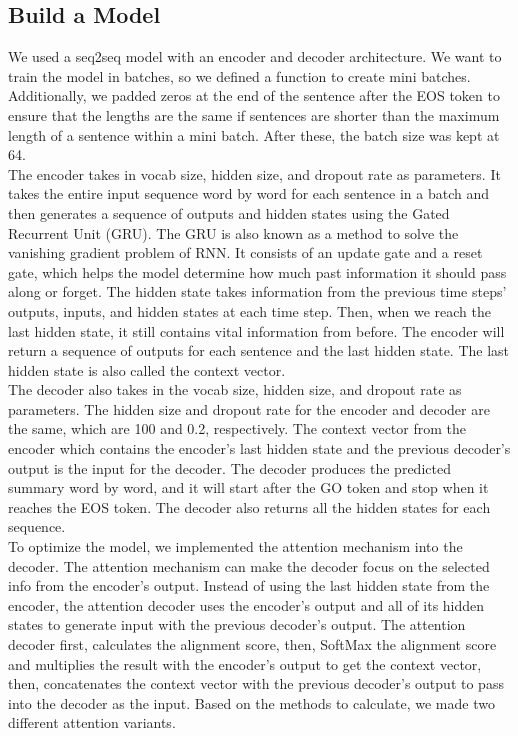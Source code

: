 \documentclass[conference]{IEEEtran}
\begin{document}
\subsection{Build a Model}
\indent We used a seq2seq model with an encoder and decoder architecture. We want to train the model in batches, so we defined a function to create mini batches. Additionally, we padded zeros at the end of the sentence after the EOS token to ensure that the lengths are the same if sentences are shorter than the maximum length of a sentence within a mini batch. After these, the batch size was kept at 64. \\

\indent The encoder takes in vocab size, hidden size, and dropout rate as parameters. It takes the entire input sequence word by word for each sentence in a batch and then generates a sequence of outputs and hidden states using the Gated Recurrent Unit (GRU). The GRU is also known as a method to solve the vanishing gradient problem of RNN. It consists of an update gate and a reset gate, which helps the model determine how much past information it should pass along or forget. The hidden state takes information from the previous time steps’ outputs, inputs, and hidden states at each time step. Then, when we reach the last hidden state, it still contains vital information from before. The encoder will return a sequence of outputs for each sentence and the last hidden state. The last hidden state is also called the context vector. \\
\indent The decoder also takes in the vocab size, hidden size, and dropout rate as parameters. The hidden size and dropout rate for the encoder and decoder are the same, which are 100 and 0.2, respectively. The context vector from the encoder which contains the encoder’s last hidden state and the previous decoder’s output is the input for the decoder. The decoder produces the predicted summary word by word, and it will start after the GO token and stop when it reaches the EOS token. The decoder also returns all the hidden states for each sequence. \\
\indent To optimize the model, we implemented the attention mechanism into the decoder. The attention mechanism can make the decoder focus on the selected info from the encoder’s output. Instead of using the last hidden state from the encoder, the attention decoder uses the encoder’s output and all of its hidden states to generate input with the previous decoder’s output. The attention decoder first, calculates the alignment score, then, SoftMax the alignment score and multiplies the result with the encoder’s output to get the context vector, then, concatenates the context vector with the previous decoder’s output to pass into the decoder as the input. Based on the methods to calculate, we made two different attention variants. \\
\end{document}
